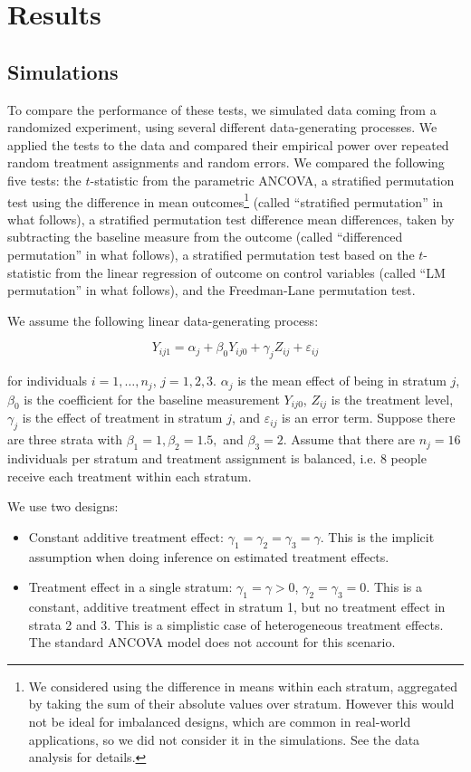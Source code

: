 \documentclass[11pt]{article}
\begin{document}
\section{Results}
\subsection{Simulations}\label{simulations}

To compare the performance of these tests, we simulated data coming from a randomized experiment, using several different data-generating processes.
We applied the tests to the data and compared their empirical power over repeated random treatment assignments and random errors.
We compared the following five tests:
the $t$-statistic from the parametric ANCOVA,
a stratified permutation test using the difference in mean outcomes\footnote{ We considered using the difference in means within each stratum, aggregated by taking the sum of their absolute values over stratum. However this would not be ideal for imbalanced designs, which are common in real-world applications, so we did not consider it in the simulations.  See the data analysis for details.}
 (called ``stratified permutation'' in what follows),
a stratified permutation test difference mean differences, taken by subtracting the baseline measure from the outcome (called ``differenced permutation'' in what follows),
a stratified permutation test based on the $t$-statistic from the linear regression of outcome on control variables (called ``LM permutation'' in what follows),
and the Freedman-Lane permutation test.
 

We assume the following linear data-generating process:

\begin{equation}\label{eqn:dgp}
Y_{ij1} =\alpha_j + \beta_0Y_{ij0} + \gamma_j Z_{ij} + \varepsilon_{ij}
\end{equation}

\noindent for individuals $i = 1, \dots, n_j$, $j = 1, 2, 3$.
$\alpha_j$ is the mean effect of being in stratum $j$, 
$\beta_0$ is the coefficient for the baseline measurement $Y_{ij0}$, 
$Z_{ij}$ is the treatment level, 
$\gamma_j$ is the effect of treatment in stratum $j$, 
and $\varepsilon_{ij}$ is an error term.
Suppose there are three strata with $\beta_1 = 1, \beta_2 = 1.5,$ and $\beta_3 = 2$.
Assume that there are $n_j = 16$ individuals per stratum and treatment assignment is balanced, i.e. 8 people receive each treatment within each stratum.

We use two designs:
\begin{itemize}
\item Constant additive treatment effect: $\gamma_1 = \gamma_2 = \gamma_3 = \gamma$. This is the implicit assumption when doing inference on estimated treatment effects.
\item Treatment effect in a single stratum: $\gamma_1 = \gamma > 0$, $\gamma_2 = \gamma_3 = 0$. This is a constant, additive treatment effect in stratum 1, but no treatment effect in strata 2 and 3. This is a simplistic case of heterogeneous treatment effects. The standard ANCOVA model does not account for this scenario.
\end{itemize}
\end{document}
